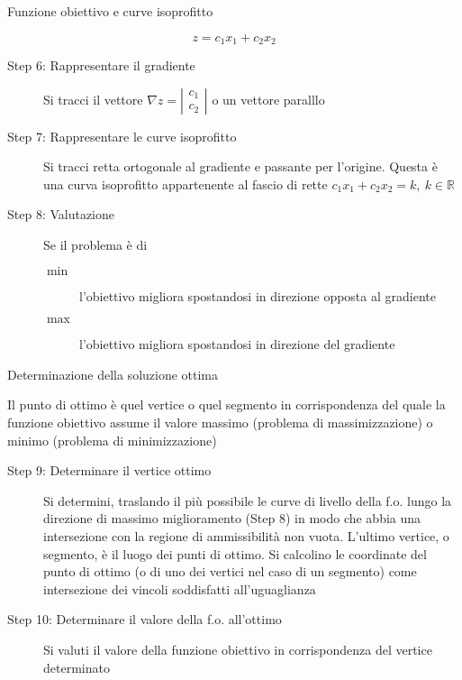\documentclass{beamer}
\begin{document}
\begin{frame}{Funzione obiettivo e curve isoprofitto}

\[z=c_1 x_1 + c_2 x_2\]

\scriptsize{
\begin{description}
 \item[Step 6: Rappresentare il gradiente]
 Si tracci il vettore $\nabla z = \left|\begin{array}{c}c_1\\c_2\end{array}\right|$
 o un vettore paralllo

 \item[Step 7: Rappresentare le curve isoprofitto]
 Si tracci retta ortogonale al gradiente e passante per l'origine.
 Questa \`e una curva isoprofitto appartenente al fascio di rette $c_1 x_1 + c_2 x_2 = k,\ k\in\mathbb{R}$
 
 \item[Step 8: Valutazione]
 Se il problema \`e di
 \begin{description}
  \item[$\min$] l'obiettivo migliora spostandosi in direzione opposta al gradiente
  \item[$\max$] l'obiettivo migliora spostandosi in direzione del gradiente
 \end{description}
 \end{description}
}
\end{frame}

\begin{frame}{Determinazione della soluzione ottima}
\scriptsize{
Il punto di ottimo \`e quel vertice o quel segmento in corrispondenza del
quale la funzione obiettivo assume il valore massimo (problema di
massimizzazione) o minimo (problema di minimizzazione)

\begin{description}
 \item[Step 9: Determinare il vertice ottimo]
 Si determini, traslando il pi\`u possibile le curve di livello della f.o. lungo
 la direzione di massimo miglioramento (Step 8) in modo che abbia una intersezione
 con la regione di ammissibilit\`a non vuota. L'ultimo vertice, o segmento, \`e
 il luogo dei punti di ottimo.
 Si calcolino le coordinate del punto di ottimo (o di uno dei vertici nel caso
 di un segmento) come intersezione dei vincoli soddisfatti all'uguaglianza
 

 \item[Step 10: Determinare il valore della f.o. all'ottimo]
 Si valuti il valore della funzione obiettivo in corrispondenza del vertice
 determinato
 \end{description} 
}
\end{frame}
\end{document}
